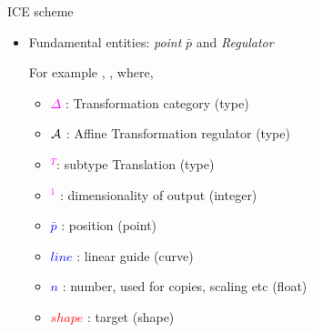
\begin{frame}{ICE scheme \cite{Hoda2005}}

\begin{itemize}[noitemsep,label=\textbullet,topsep=2pt,parsep=2pt,partopsep=2pt]
\item[] Fundamental entities: {\em point} $\bar{p}$ and {\em Regulator}

\vspace{5mm}
{\Large {}}
\vspace{5mm}

	 For example ,  	 ,	where,

		\begin{itemize}[noitemsep,label=\textbullet,topsep=2pt,parsep=2pt,partopsep=2pt]
		\item 	\textcolor{magenta}{$\Delta$} : Transformation category (type)
	     	\item 	\textcolor{magenta}{${\bf \mathcal{A}}$} : Affine Transformation regulator (type)
		\item  	\textcolor{magenta}{$^T$}: subtype Translation (type)
		 \item 	\textcolor{magenta}{$^1$} : dimensionality of output (integer)
	        \item 	\textcolor{blue}{ $\bar{p}$} : position (point)
  		\item  	\textcolor{blue}{$line$} : linear guide (curve)
		 \item  	\textcolor{blue}{$n$} : number, used for copies, scaling etc (float)
		 \item  	\textcolor{red}{$shape$} : target (shape)
		\end{itemize}
\end{itemize}
\end{frame}


